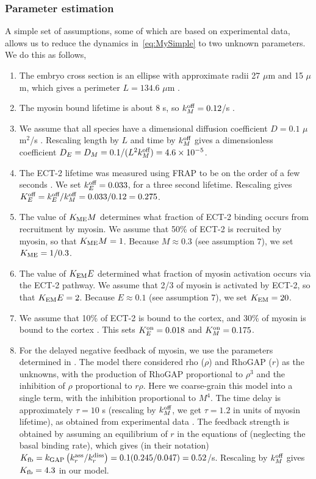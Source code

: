 \documentclass[11pt]{article}
\begin{document}
\subsubsection{Parameter estimation}
A simple set of assumptions, some of which are based on experimental data, allows us to reduce the dynamics in\ \eqref{eq:MySimple} to two unknown parameters. We do this as follows, 
\begin{enumerate}
\item The embryo cross section is an ellipse with approximate radii 27 $\mu$m and 15 $\mu$m, which gives a perimeter $L=134.6$ $\mu$m \cite{goehring2011polarization} .
\item The myosin bound lifetime is about 8 s, so $k^\text{off}_M=0.12$/s \cite{gross2019guiding}. 
\item We assume that all species have a dimensional diffusion coefficient $D=0.1$ $\mu$m$^2$/s \cite{goehring2011polarization, gross2019guiding, robin2014single}. Rescaling length by $L$ and time by $k^\text{off}_M$ gives a dimensionless coefficient $D_E=D_M=0.1/(L^2 k^\text{off}_M)=4.6 \times 10^{-5}$. 
\item The ECT-2 lifetime was measured using FRAP to be on the order of a few seconds \cite{longhini2022aurora}. We set $k^\text{off}_E=0.033$, for a three second lifetime. Rescaling gives $K^\text{off}_E=k^\text{off}_E/k^\text{off}_M=0.033/0.12=0.275$. 
\item The value of $K_\text{ME} M$ determines what fraction of ECT-2 binding occurs from recruitment by myosin. We assume that 50\% of ECT-2 is recruited by myosin, so that $K_\text{ME} M = 1$. Because $M \approx 0.3$ (see assumption 7), we set $K_\text{ME}=1/0.3$. 
\item The value of $K_\text{EM} E$ determined what fraction of myosin activation occurs via the ECT-2 pathway. We assume that 2/3 of myosin is activated by ECT-2, so that $K_\text{EM} E=2$. Because $E \approx 0.1$ (see assumption 7), we set $K_\text{EM}=20$. 
\item We assume that 10\% of ECT-2 is bound to the cortex, and 30\% of myosin is bound to the cortex \cite[Fig.~S3j]{gross2019guiding}. This sets $K^\text{on}_E=0.018$ and $K^\text{on}_M=0.175$. 
\item For the delayed negative feedback of myosin, we use the parameters determined in \cite{michaux2018excitable}. The model there considered rho ($\rho$) and RhoGAP ($r$) as the unknowns, with the production of RhoGAP proportional to $\rho^3$ and the inhibition of $\rho$ proportional to $r \rho$. Here we coarse-grain this model into a single term, with the inhibition proportional to $M^4$. The time delay is approximately $\tau=10$ s (rescaling by $k^\text{off}_M$, we get $\tau=1.2$ in units of myosin lifetime), as obtained from experimental data \cite{michaux2018excitable}. The feedback strength is obtained by assuming an equilibrium of $r$ in the equations of \cite{michaux2018excitable} (neglecting the basal binding rate), which gives (in their notation) $K_\text{fb}=k_\text{GAP}\left(k_r^\text{ass}/k_r^\text{diss}\right)=0.1(0.245/0.047)=0.52$/s. Rescaling by $k^\text{off}_M$ gives $K_\text{fb}=4.3$ in our model. 
\end{enumerate}
\end{document}
